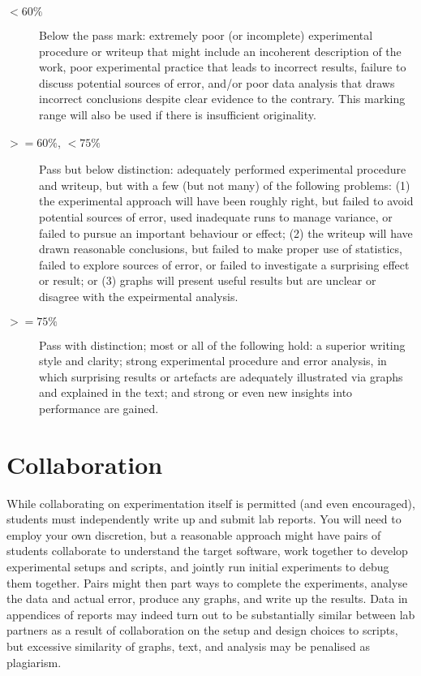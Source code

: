 \documentclass[a4paper,10pt]{article}
\begin{document}
\begin{description}
\item[$<60\%$] Below the pass mark: extremely poor (or incomplete)
  experimental procedure or writeup that might include an incoherent
  description of the work, poor experimental practice that leads to incorrect
  results, failure to discuss potential sources of error, and/or poor data
  analysis that draws incorrect conclusions despite clear evidence to the
  contrary.
  This marking range will also be used if there is insufficient originality.
\item[$>=60\%$, $<75\%$] Pass but below distinction: adequately performed
  experimental procedure and writeup, but with a few (but not many) of the
  following problems:
  (1) the experimental approach will have been roughly right, but failed to
  avoid potential sources of error, used inadequate runs to manage variance,
  or failed to pursue an important behaviour or effect;
  (2) the writeup will have drawn reasonable conclusions, but failed to make
  proper use of statistics, failed to explore sources of error, or failed to
  investigate a surprising effect or result; or
  (3) graphs will present useful results but are unclear or disagree with the
  expeirmental analysis.
\item[$>=75\%$] Pass with distinction; most or all of the following hold:
  a superior writing style and clarity; strong experimental procedure and
  error analysis, in which surprising results or artefacts are adequately
  illustrated via graphs and explained in the text; and strong or even new
  insights into performance are gained.
\end{description}

\section*{Collaboration}

While collaborating on experimentation itself is permitted (and even
encouraged), students must independently write up and submit lab reports.
You will need to employ your own discretion, but a reasonable approach might
have pairs of students collaborate to understand the target software, work
together to develop experimental setups and scripts, and jointly run initial
experiments to debug them together.
Pairs might then part ways to complete the experiments, analyse the data and
actual error, produce any graphs, and write up the results.
Data in appendices of reports may indeed turn out to be substantially similar
between lab partners as a result of collaboration on the setup and design
choices to scripts, but excessive similarity of graphs, text, and analysis
may be penalised as plagiarism.
\end{document}
